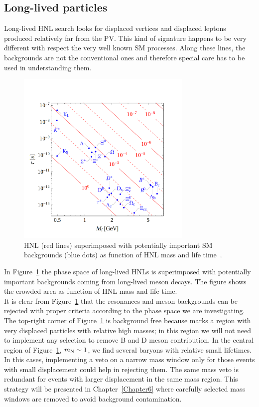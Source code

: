 \subsection{Long-lived particles}\label{sec:c4LLbgk}
Long-lived HNL search looks for displaced
vertices and displaced leptons produced relatively far from the PV.
This kind of signature happens to be very different with respect the
very well known SM processes. Along these lines, the backgrounds
are not the conventional ones and
therefore special care has to be used in understanding them.
\begin{figure}[h!]
\centering
 \includegraphics[clip,trim=0.5cm 0.5cm 2cm 2cm, width=0.75\textwidth]{Figures/c4/resonances.pdf}
  \caption{HNL \mixpar (red lines) superimposed with potentially important SM backgrounds
(blue dots) as function of HNL mass and life time~\cite{Drewes_2020_jan}.}
  \label{fig:c4LLbgk}
\end{figure}


In Figure~\ref{fig:c4LLbgk} the phase space of long-lived HNLs is
superimposed with potentially important backgrounds coming from
long-lived meson decays. The figure shows the crowded area as function
of HNL mass and life time.\\
It is clear from Figure~\ref{fig:c4LLbgk} that the resonances and
meson backgrounds can be rejected with proper criteria according to
the phase space we are investigating.
The top-right corner of Figure~\ref{fig:c4LLbgk} is
background free because marks a region with very displaced particles
with relative high masses; in this region we will not need to implement
any selection to remove B and D meson contribution. In the central
region of Figure~\ref{fig:c4LLbgk}, $m_\mathrm{N} \sim 1$\GeV, we find several
baryons with relative small lifetimes. In this cases, implementing a 
veto on a narrow mass window only for those events with small
displacement could help in rejecting them. The same mass veto is redundant
for events with larger displacement in the same mass region.
This strategy will be presented in
Chapter~\ref{Chapter6} where carefully selected mass windows are removed
to avoid background contamination.




